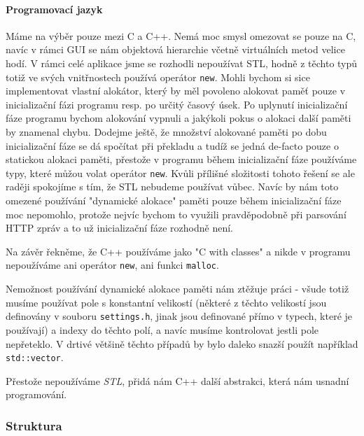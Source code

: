\paragraph{Programovací jazyk}
Máme na výběr pouze mezi C a C++.
Nemá moc smysl omezovat se pouze na C, navíc v rámci GUI se nám objektová hierarchie včetně
virtuálních metod velice hodí.
V rámci celé aplikace jsme se rozhodli nepoužívat STL, hodně z těchto typů totiž ve svých vnitřnostech
používá operátor \texttt{new}.
Mohli bychom si sice implementovat vlastní alokátor, který by měl povoleno alokovat paměť pouze
v inicializační fázi programu resp. po určitý časový úsek.
Po uplynutí inicializační fáze programu bychom alokování vypnuli a jakýkoli pokus o alokaci další
paměti by znamenal chybu.
Dodejme ještě, že množství alokované paměti po dobu inicializační fáze se dá spočítat při překladu
a tudíž se jedná de-facto pouze o statickou alokaci paměti, přestože v programu během inicializační
fáze používáme typy, které můžou volat operátor \texttt{new}.
Kvůli přílišné složitosti tohoto řešení se ale raději spokojíme s tím, že STL nebudeme používat vůbec.
Navíc by nám toto omezené používání "dynamické alokace" paměti pouze během inicializační fáze
moc nepomohlo, protože nejvíc bychom to využili pravděpodobně při parsování HTTP zpráv a to už
inicializační fáze rozhodně není.

Na závěr řekněme, že C++ používáme jako "C with classes" a nikde v programu nepoužíváme ani operátor
\texttt{new}, ani funkci \texttt{malloc}.

Nemožnost používání dynamické alokace paměti nám ztěžuje práci - všude totiž musíme používat pole s
konstantní velikostí (některé z těchto velikostí jsou definovány v souboru \texttt{settings.h}, jinak
jsou definované přímo v typech, které je používají) a indexy do těchto polí, a navíc musíme kontrolovat
jestli pole nepřeteklo.
V drtivé většině těchto případů by bylo daleko snazší použít například \texttt{std::vector}.

Přestože nepoužíváme \emph{STL}, přidá nám C++ další abstrakci, která nám usnadní programování.

\subsubsection{Struktura}

